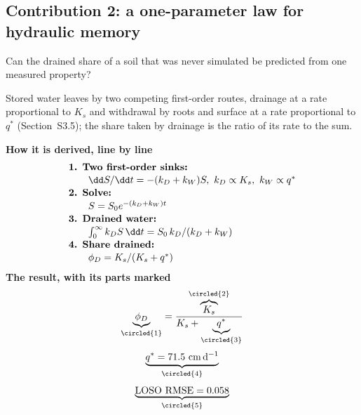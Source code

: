 \begin{pins}
\end{pins}

\subsection{Contribution 2: a one-parameter law for hydraulic memory}
\begin{problem}
Can the drained share of a soil that was never simulated be predicted from one measured property?
\end{problem}
\begin{derivation}
Stored water leaves by two competing first-order routes, drainage at a rate proportional to $K_s$ and withdrawal by roots and surface at a rate proportional to $q^\ast$ (Section~S3.5); the share taken by drainage is the ratio of its rate to the sum.
\end{derivation}
\begin{keyresult}
\begin{pencil}
{\small\noindent\textbf{How it is derived, line by line}
\[\begin{array}{@{}l@{}}\textbf{1. Two first-order sinks:}\\[1pt]
\qquad \dd S/\dd t=-(k_D+k_W)S,\ k_D\propto K_s,\ k_W\propto q^\ast\\[1pt]
\textbf{2. Solve:}\\[1pt]
\qquad S=S_0e^{-(k_D+k_W)t}\\[1pt]
\textbf{3. Drained water:}\\[1pt]
\qquad \textstyle\int_0^\infty k_DS\,\dd t=S_0\,k_D/(k_D+k_W)\\[1pt]
\textbf{4. Share drained:}\\[1pt]
\qquad \phi_D=K_s/(K_s+q^\ast)
\end{array}\]}
\noindent\textbf{The result, with its parts marked}
\[\underbrace{\phi_D}_{\circled{1}}=\frac{\overbrace{K_s}^{\circled{2}}}{K_s+\underbrace{q^\ast}_{\circled{3}}}\]
\[\underbrace{q^\ast=71.5\ \mathrm{cm\,d^{-1}}}_{\circled{4}}\]
\[\underbrace{\text{LOSO RMSE}=0.058}_{\circled{5}}\]
\end{pencil}
\end{keyresult}
